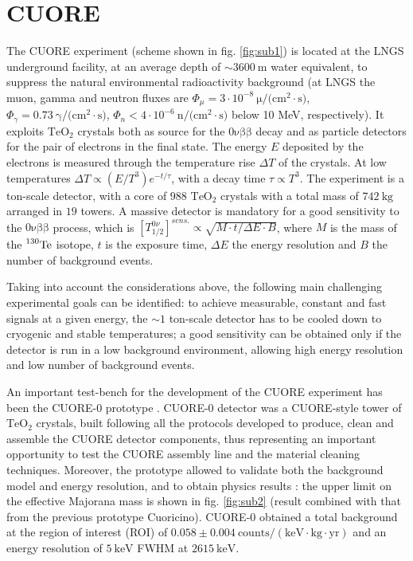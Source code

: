 \documentclass[12pt]{article}
\begin{document}
\section{CUORE}
The CUORE experiment \cite{qexp}  (scheme shown in fig. \ref{fig:sub1}) is located at the LNGS underground facility, at an average depth of $\sim3600~\mathrm{m}$ water equivalent, to suppress the natural environmental radioactivity background (at LNGS the muon, gamma and neutron fluxes are $\Phi_{\mu} = 3\cdot 10^{-8}~\mathrm{\mu/(cm^{2} \cdot s})$, $\Phi_{\gamma} = 0.73~\mathrm{\gamma/(cm^{2} \cdot s})$, $\Phi_{n} < 4\cdot 10^{-6}~\mathrm{n/(cm^{2} \cdot s})$ below 10 MeV, respectively). It exploits $\mathrm{TeO_2}$ crystals both as source for the $\mathrm{0 \nu \beta \beta}$ decay and as particle detectors for the pair of electrons in the final state. The energy $E$ deposited by the electrons is measured through the temperature rise $\Delta T$ of the crystals. At low temperatures $\Delta T \propto (E/T^{3}) e^{-t/\tau}$, with a decay time $\tau \propto T^{3}$. The experiment is a ton-scale detector, with a core of $988$ $\mathrm{TeO_2}$ crystals with a total mass of $742~\mathrm{kg}$ arranged in $19$ towers. A massive detector is mandatory for a good sensitivity to the $\mathrm{0 \nu \beta \beta}$ process, which is $[T^{0\nu}_{1/2}]^{sens.} \propto \sqrt{M \cdot t / \Delta E \cdot B}$, where $M$ is the mass of the $\prescript{130}{}{\mathrm{Te}}$ isotope, $t$ is the exposure time, $\Delta E$ the energy resolution and $B$ the number of background events.

Taking into account the considerations above, the following main challenging experimental goals can be identified: to achieve measurable, constant and fast signals at a given energy, the $\sim 1$ ton-scale detector has to be cooled down to cryogenic and stable temperatures; a good sensitivity can be obtained only if  the detector is run in a low background environment, allowing high energy resolution and low number of background events. 

An important test-bench for the development of the CUORE experiment has been the CUORE-0 prototype \cite{q0exp}. CUORE-0 detector was a CUORE-style tower of $\mathrm{TeO_2}$ crystals, built following all the protocols developed to produce, clean and assemble the CUORE detector components, thus representing an important opportunity to test the CUORE assembly line and the material cleaning techniques. Moreover, the prototype allowed to validate both the background model and energy resolution, and to obtain physics results \cite{q0res}: the upper limit on the effective Majorana mass is shown in fig. \ref{fig:sub2} (result combined with that from the previous prototype Cuoricino). CUORE-0 obtained a total background at the region of interest (ROI) of $0.058 \pm 0.004~\mathrm{counts/(keV \cdot kg \cdot yr)}$ and an energy resolution of $5~\mathrm{keV}$ FWHM at $2615~\mathrm{keV}$.
\end{document}
